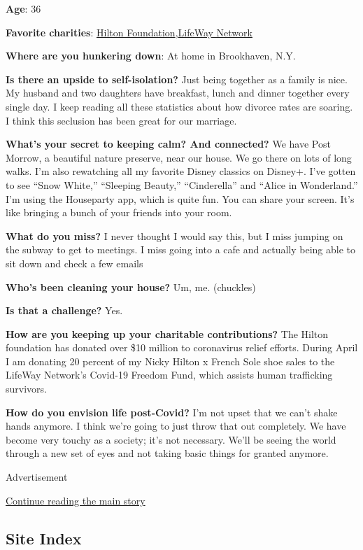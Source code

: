 \textbf{Age}: 36

\textbf{Favorite charities}: \href{https://hiltonfoundation.org/}{Hilton
Foundation},\href{https://lifewaynetwork.org/}{LifeWay Network}

\textbf{Where are you hunkering down}: At home in Brookhaven, N.Y.

\textbf{Is there an upside to self-isolation?} Just being together as a
family is nice. My husband and two daughters have breakfast, lunch and
dinner together every single day. I keep reading all these statistics
about how divorce rates are soaring. I think this seclusion has been
great for our marriage.

\textbf{What's your secret to keeping calm? And connected?} We have Post
Morrow, a beautiful nature preserve, near our house. We go there on lots
of long walks. I'm also rewatching all my favorite Disney classics on
Disney+. I've gotten to see ``Snow White,'' ``Sleeping Beauty,''
``Cinderella'' and ``Alice in Wonderland.'' I'm using the Houseparty
app, which is quite fun. You can share your screen. It's like bringing a
bunch of your friends into your room.

\textbf{What do you miss?} I never thought I would say this, but I miss
jumping on the subway to get to meetings. I miss going into a cafe and
actually being able to sit down and check a few emails

\textbf{Who's been cleaning your house?} Um, me. (chuckles)

\textbf{Is that a challenge?} Yes.

\textbf{How are you keeping up your charitable contributions?} The
Hilton foundation has donated over \$10 million to coronavirus relief
efforts. During April I am donating 20 percent of my Nicky Hilton x
French Sole shoe sales to the LifeWay Network's Covid-19 Freedom Fund,
which assists human trafficking survivors.

\textbf{How do you envision life post-Covid?} I'm not upset that we
can't shake hands anymore. I think we're going to just throw that out
completely. We have become very touchy as a society; it's not necessary.
We'll be seeing the world through a new set of eyes and not taking basic
things for granted anymore.

Advertisement

\protect\hyperlink{after-bottom}{Continue reading the main story}

\hypertarget{site-index}{%
\subsection{Site Index}\label{site-index}}

